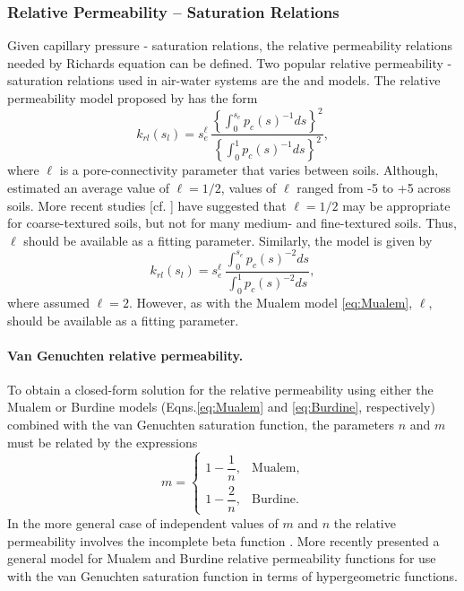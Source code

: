 \subsubsection{Relative Permeability -- Saturation Relations}
\label{sec:richards-relative-permeability}

Given capillary pressure - saturation relations, the relative
permeability relations needed by Richards equation can be defined.  
Two popular relative permeability - saturation relations used in air-water 
systems are the \citet{mualem1976new} and \citet{burdine1953relative} models.
The relative permeability model proposed by \citet{mualem1976new} has the form
\begin{equation} \label{eq:Mualem}
  k_{rl}(s_l) = s_e^{\ell} \, 
    \frac{ \left\{ \displaystyle\int_0^{s_e} p_c(s)^{-1} ds \right\}^2 }
    { \left\{ \displaystyle\int_0^{1} p_c(s)^{-1} ds \right\}^2 },
\end{equation}
where $\ell$ is a pore-connectivity parameter that varies between soils. 
Although, \citet{mualem1976new} estimated an average value of
$\ell=1/2$, values of $\ell$ ranged from -5 to +5 across soils. More recent studies
[cf. \citet{vanG_retc_1991}] have suggested that $\ell=1/2$ may be
appropriate for coarse-textured soils, but not for many medium- and
fine-textured soils. Thus, $\ell$ should be available as a fitting parameter.
Similarly, the \citet{burdine1953relative} model is given by
\begin{equation}
\label{eq:Burdine}
  k_{rl}(s_l) = s_e^{\ell} \, 
    \frac{ \displaystyle\int_0^{s_e} p_c(s)^{-2} ds }
         { \displaystyle\int_0^{1} p_c(s)^{-2} ds },
\end{equation}
where \citet{burdine1953relative} assumed $\ell=2$. However, as with
the Mualem model \eqref{eq:Mualem}, $\ell$, should be available as a
fitting parameter.


\paragraph{Van Genuchten relative permeability.}
To obtain a closed-form solution for the relative permeability using
either the Mualem or Burdine models (Eqns.\eqref{eq:Mualem} and
\eqref{eq:Burdine}, respectively) combined with the van Genuchten
saturation function, the parameters $n$ and $m$ must be related by the
expressions
\begin{equation}
\label{eq:lambda} 
m = \left\{
  \begin{array}{ll}
    1 - \dfrac{1}{n}, & \text{Mualem},\\[9pt]
    1 - \dfrac{2}{n}, & \text{Burdine}.
  \end{array}
\right.
\end{equation}
In the more general case of independent values of $m$ and $n$ the
relative permeability involves the incomplete beta function \citep{vangenuchten1985}. 
More recently \citep{douradoneto2011} presented a general model for Mualem and 
Burdine relative permeability functions for use with the van Genuchten saturation 
function in terms of hypergeometric functions.

